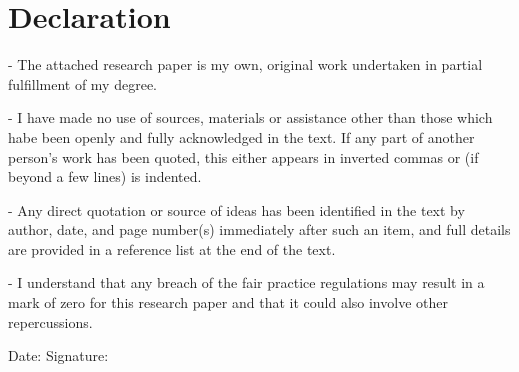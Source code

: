 \chapter*{Declaration}
\label{ch:declaration}

\begin{flushleft}
- The attached research paper is my own, original work undertaken in partial fulfillment of my degree.
\end{flushleft}

\begin{flushleft}
- I have made no use of sources, materials or assistance other than those which habe been openly and fully acknowledged in the text. If any part of another person’s work has been quoted, this either appears in inverted commas or (if beyond a few lines) is indented.
\end{flushleft}

\begin{flushleft}
- Any direct quotation or source of ideas has been identified in the text by author, date, and page number(s) immediately after such an item, and full details are provided in a reference list at the end of the text.
\end{flushleft}

\begin{flushleft}
- I understand that any breach of the fair practice regulations may result in a mark of zero for this research paper and that it could also involve other repercussions.
\end{flushleft}

\vspace{1.5cm}

Date:	\hrulefill\enspace Signature: \hrulefill
\\[3.5cm]